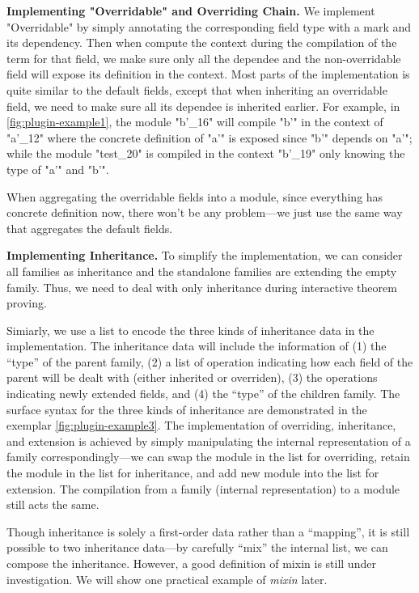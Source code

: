 \textbf{Implementing "Overridable" and Overriding Chain.}
We implement "Overridable" by simply annotating the corresponding field type with a mark and its dependency. Then when compute the context during the compilation of the term for that field, we make sure only all the dependee and the non-overridable field will expose its definition in the context. Most parts of the implementation is quite similar to the default fields, except that when inheriting an overridable field, we need to make sure all its dependee is inherited earlier.  For example, in \cref{fig:plugin-example1}, the module "b'_16" will compile "b'" in the context of "a'_12" where the concrete definition of "a'" is exposed since "b'" depends on "a'"; while the module "test_20" is compiled in the context "b'_19" only knowing the type of "a'" and "b'".

When aggregating the overridable fields into a module, since everything has concrete definition now, there won't be any problem---we just use the same way that aggregates the default fields.



\textbf{Implementing Inheritance.}
To simplify the implementation, we can consider all families as
inheritance and the standalone families are extending the empty family.
Thus, we need to deal with only inheritance during interactive theorem proving.


Simiarly, we
use a list to encode the three kinds of inheritance data in the
implementation. The inheritance data will include the
information of (1) the ``type'' of the parent family, (2) a list of
operation indicating how each field of the parent will be dealt with
(either inherited or overriden), (3) the operations indicating newly
extended fields, and (4) the ``type'' of the children family.
The surface syntax for the three kinds of inheritance
are demonstrated in the exemplar \cref{fig:plugin-example3}. The
implementation of overriding, inheritance, and extension is achieved by
simply manipulating the internal representation of a family
correspondingly---we can swap the module in the list for overriding,
retain the module in the list for inheritance, and add new module into
the list for extension. The compilation from a family (internal
representation) to a module still acts the same.

Though inheritance is solely a first-order data rather
than a ``mapping'', it is still possible to  two inheritance
data---by carefully ``mix'' the internal list, we can compose the
inheritance. However, a good definition of mixin is still under
investigation. We will show one practical example of \textit{mixin}
later.

